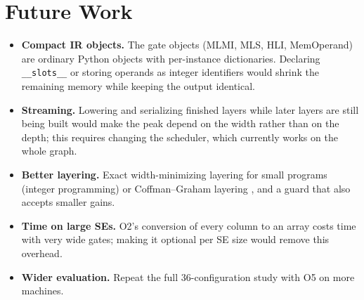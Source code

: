 \documentclass[12pt,a4paper,oneside]{report}
\newcommand{\code}[1]{\texttt{#1}}
\begin{document}
\section{Future Work}
\begin{itemize}
\item \textbf{Compact IR objects.} The gate objects (MLMI, MLS, HLI, MemOperand) are ordinary
      Python objects with per-instance dictionaries. Declaring \code{\_\_slots\_\_} \cite{pyslots}
      or storing operands as integer identifiers would shrink the remaining memory while keeping
      the output identical.
\item \textbf{Streaming.} Lowering and serializing finished layers while later layers are still
      being built would make the peak depend on the width rather than on the depth; this requires
      changing the scheduler, which currently works on the whole graph.
\item \textbf{Better layering.} Exact width-minimizing layering for small programs (integer
      programming) or Coffman--Graham layering \cite{coffman}, and a guard that also accepts
      smaller gains.
\item \textbf{Time on large SEs.} O2's conversion of every column to an array costs time with very
      wide gates; making it optional per SE size would remove this overhead.
\item \textbf{Wider evaluation.} Repeat the full 36-configuration study with O5 on more machines.
\end{itemize}
\end{document}
